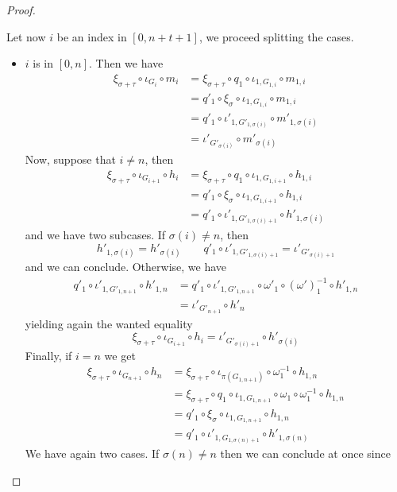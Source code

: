 \begin{proof}
\begin{itemize}
		Let now $i$ be an index in $[0, n+t+1]$, we proceed splitting the cases.
		\begin{itemize}
			\item $i$ is in $[0,n]$. Then we have
			\begin{align*}
				\xi_{\sigma+\tau}\circ \iota_{G_i} \circ m_i &= \xi_{\sigma+\tau} \circ q_1\circ \iota_{1, G_{1,i}}\circ m_{1,i}\\&=q'_1 \circ \xi_\sigma \circ \iota_{1, G_{1,i}}\circ m_{1,i}\\&= q'_1\circ \iota'_{1, G'_{1,\sigma(i)}}\circ m'_{1,\sigma(i)}\\&=\iota'_{G'_{\sigma(i)}}\circ m'_{\sigma(i)}
			\end{align*}
			Now, suppose that $i\neq n$, then 
			\begin{align*}
				\xi_{\sigma+\tau}\circ \iota_{G_{i+1}} \circ h_i &= \xi_{\sigma+\tau} \circ q_1\circ \iota_{1, G_{1,{i+1}}}\circ h_{1,i}\\&=q'_1\circ \xi_\sigma \circ \iota_{1, G_{1,{i+1}}}\circ h_{1,i}\\&= q'_1\circ \iota'_{1, G'_{1,\sigma(i)+1}}\circ h'_{1,\sigma(i)}
			\end{align*}
			and we have two subcases. If $\sigma(i)\neq n$, then \[h'_{1, \sigma(i)}=h'_{\sigma(i)} \qquad q'_1\circ \iota'_{1, G'_{1,\sigma(i)+1}}=
			\iota'_{G'_{\sigma(i)+1}}\] 
			and we can conclude. Otherwise, we have
			\begin{align*}q'_1\circ \iota'_{1, G'_{1,n+1}}\circ h'_{1,n}&=q'_1 \circ \iota'_{1,G'_{1,n+1}} \circ \omega'_1\circ (\omega')^{-1}_1 \circ h'_{1,n}\\&=\iota'_{G'_{n+1}}\circ h'_n
			\end{align*}
			yielding again the wanted equality
			\[\xi_{\sigma+\tau}\circ \iota_{G_{i+1}} \circ h_i=\iota'_{G'_{\sigma(i)+1}}\circ h'_{\sigma(i)}\]
			Finally, if $i=n$ we get
			\begin{align*}
				\xi_{\sigma+\tau}\circ \iota_{G_{n+1}} \circ h_n &= \xi_{\sigma+\tau} \circ \iota_{\pi(G_{1,n+1})} \circ \omega^{-1}_1\circ h_{1,n}\\&= \xi_{\sigma+\tau} \circ q_1\circ \iota_{1, G_{1,n+1}} \circ \omega_1 \circ \omega^{-1}_1 \circ h_{1,n}\\&=q'_1 \circ \xi_\sigma \circ \iota_{1, G_{1,n+1}} \circ h_{1,n}\\&=q'_1\circ \iota'_{1, G_{1,\sigma(n)+1}} \circ h'_{1,\sigma(n)}
			\end{align*}
			We have again two cases. If $\sigma(n)\neq n$ then we can conclude at once since 

\end{itemize}
\end{itemize}
\end{proof}
